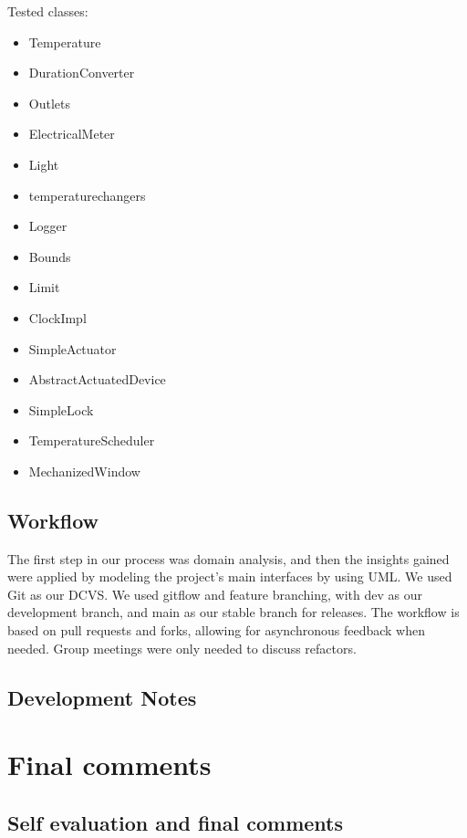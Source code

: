 \documentclass[a4paper,12pt]{report}
\begin{document}
Tested classes:
\begin{itemize}
	\item Temperature
	\item DurationConverter
	\item Outlets
	\item ElectricalMeter
	\item Light
	\item temperaturechangers
	\item Logger
	\item Bounds
	\item Limit
	\item ClockImpl
	\item SimpleActuator
	\item AbstractActuatedDevice
	\item SimpleLock
	\item TemperatureScheduler
	\item MechanizedWindow
\end{itemize}





\section{Workflow}
The first step in our process was domain analysis, and then the insights gained were applied by modeling 
the project's main interfaces by using UML.
We used Git as our DCVS. We used gitflow and feature branching, with dev as our development branch,
and main as our stable branch for releases. The workflow is based on pull requests and forks, allowing for asynchronous feedback when needed.
Group meetings were only needed to discuss refactors.






\section{Development Notes}





\chapter{Final comments}

\section{Self evaluation and final comments}
\end{document}
